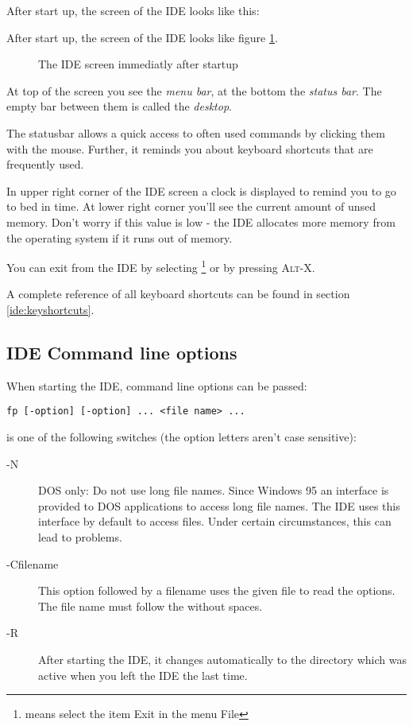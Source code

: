 \begin{htmlonly}
After start up, the screen of the IDE looks like this:
\end{htmlonly}
\begin{latexonly}
After start up, the screen of the IDE looks like figure \ref{fig:idestart}.
\begin{figure}
\caption{The IDE screen immediatly after startup}
\label{fig:idestart}
\ifpdf
{}
\else
\fi
\end{figure}
\end{latexonly}
At top of the screen you see the \emph{menu bar}, at the bottom
the \emph{status bar}. The empty bar between them is called the
\emph{desktop}.

The statusbar allows a quick access to often used commands by
clicking them with the mouse. Further, it reminds you about
keyboard shortcuts that are frequently used.

In upper right corner of the IDE screen a clock is displayed to
remind you to go to bed in time. At lower right corner you'll
see the current amount of unsed memory. Don't worry if this value
is low - the IDE allocates more memory from the operating system
if it runs out of memory.

You can exit from the IDE by selecting 
\footnote{ means select the item Exit in the menu File}
or by pressing \textsc{Alt-X}.

\begin{remark}
A complete reference of all keyboard shortcuts can be found in
section \ref{ide:keyshortcuts}.
\end{remark}

\subsection{IDE Command line options}

When starting the IDE, command line options can be passed:
\begin{verbatim}
fp [-option] [-option] ... <file name> ...
\end{verbatim}

 is one of the following switches (the option letters
aren't case sensitive):

\begin{description}
\item [-N] DOS only: Do not use long file names. Since Windows 95 an interface
is provided to DOS applications to access long file names. The IDE uses
this interface by default to access files. Under certain circumstances, this
can lead to problems.
\item [-Cfilename] This option followed by
a filename uses the given file to read the options. The file name
must follow the  without spaces.
\item [-R] After starting the IDE, it changes automatically to the directory
which was active when you left the IDE the last time.
\end{description}

